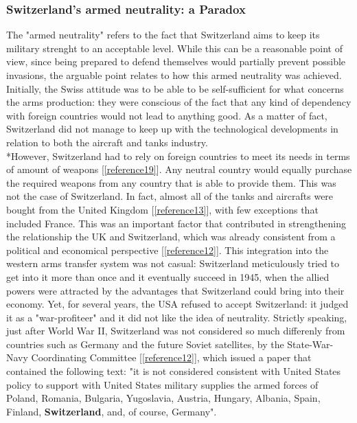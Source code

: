 \documentclass[a4paper]{article}
\begin{document}
\subsubsection{Switzerland's armed neutrality: a Paradox}
The "armed neutrality" refers to the fact that Switzerland aims to keep its military strenght to an acceptable level. While this can be a reasonable point of view, since being prepared to defend themselves would partially prevent possible invasions, the arguable point relates to how this armed neutrality was achieved. 
Initially, the Swiss attitude was to be able to be self-sufficient for what concerns the arms production: they were conscious of the fact that any kind of dependency with foreign countries would not lead to anything good. As a matter of fact, Switzerland did not manage to keep up with the technological developments in relation to both the aircraft and tanks industry.
\\*However, Switzerland had to rely on foreign countries to meet its needs in terms of amount of weapons [\ref{reference19}]. Any neutral country would equally purchase the required weapons from any country that is able to provide them. This was not the case of Switzerland. In fact, almost all of the tanks and aircrafts were bought from the United Kingdom [\ref{reference13}], with few exceptions that included France. %
This was an important factor that contributed in strengthening the relationship the UK and Switzerland, which was already consistent from a political and economical perspective [\ref{reference12}]. This integration into the western arms transfer system was not casual: Switzerland meticulously tried to get into it more than once and it eventually succeed in 1945, when the allied powers were attracted by the advantages that Switzerland could bring into their economy. Yet, for several years, the USA refused to accept Switzerland: it judged it as a "war-profiteer" and it did not like the idea of neutrality. Strictly speaking, just after World War II, Switzerland was not considered so much differenly from countries such as Germany and the future Soviet satellites, by the State-War-Navy Coordinating Committee [\ref{reference12}], which issued a paper that contained the following text: "it is not considered consistent with United States policy to support with United States military supplies the armed forces of Poland, Romania, Bulgaria, Yugoslavia, Austria, Hungary, Albania, Spain, Finland, \textbf{Switzerland}, and, of course, Germany". 
\end{document}

